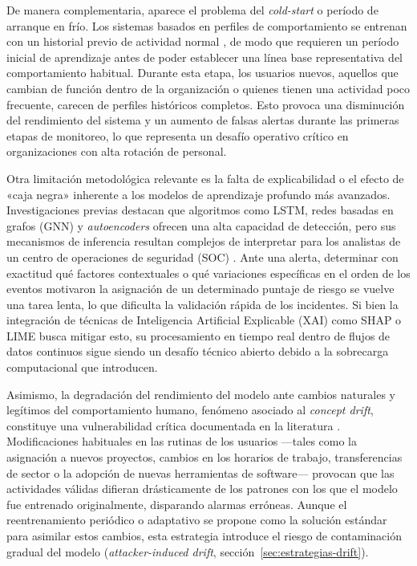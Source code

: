 De manera complementaria, aparece el problema del \emph{cold-start} o período de arranque en frío. Los sistemas basados en perfiles de comportamiento se entrenan con un historial previo de actividad normal \parencite{VillarrealVasquez2021, Artioli2024}, de modo que requieren un período inicial de aprendizaje antes de poder establecer una línea base representativa del comportamiento habitual. Durante esta etapa, los usuarios nuevos, aquellos que cambian de función dentro de la organización o quienes tienen una actividad poco frecuente, carecen de perfiles históricos completos. Esto provoca una disminución del rendimiento del sistema y un aumento de falsas alertas durante las primeras etapas de monitoreo, lo que representa un desafío operativo crítico en organizaciones con alta rotación de personal.

Otra limitación metodológica relevante es la falta de explicabilidad o el efecto de «caja negra» inherente a los modelos de aprendizaje profundo más avanzados. Investigaciones previas destacan que algoritmos como LSTM, redes basadas en grafos (GNN) y \emph{autoencoders} ofrecen una alta capacidad de detección, pero sus mecanismos de inferencia resultan complejos de interpretar para los analistas de un centro de operaciones de seguridad (SOC) \parencite{Landauer2023Survey}. Ante una alerta, determinar con exactitud qué factores contextuales o qué variaciones específicas en el orden de los eventos motivaron la asignación de un determinado puntaje de riesgo se vuelve una tarea lenta, lo que dificulta la validación rápida de los incidentes. Si bien la integración de técnicas de Inteligencia Artificial Explicable (XAI) como SHAP o LIME busca mitigar esto, su procesamiento en tiempo real dentro de flujos de datos continuos sigue siendo un desafío técnico abierto debido a la sobrecarga computacional que introducen.

Asimismo, la degradación del rendimiento del modelo ante cambios naturales y legítimos del comportamiento humano, fenómeno asociado al \emph{concept drift}, constituye una vulnerabilidad crítica documentada en la literatura \parencite{Artioli2024}. Modificaciones habituales en las rutinas de los usuarios —tales como la asignación a nuevos proyectos, cambios en los horarios de trabajo, transferencias de sector o la adopción de nuevas herramientas de software— provocan que las actividades válidas difieran drásticamente de los patrones con los que el modelo fue entrenado originalmente, disparando alarmas erróneas. Aunque el reentrenamiento periódico o adaptativo se propone como la solución estándar para asimilar estos cambios, esta estrategia introduce el riesgo de contaminación gradual del modelo (\emph{attacker-induced drift}, sección~\ref{sec:estrategias-drift}).

